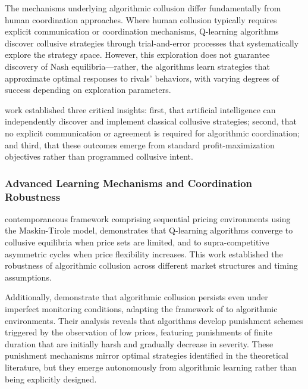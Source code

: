     \begin{quote}
    \end{quote}

The mechanisms underlying algorithmic collusion differ fundamentally from human coordination approaches. Where human collusion typically requires explicit communication or coordination mechanisms, Q-learning algorithms discover collusive strategies through trial-and-error processes that systematically explore the strategy space. However, this exploration does not guarantee discovery of Nash equilibria---rather, the algorithms learn strategies that approximate optimal responses to rivals' behaviors, with varying degrees of success depending on exploration parameters.

\textcite{calvano_artificial_2020} work established three critical insights: first, that artificial intelligence can independently discover and implement classical collusive strategies; second, that no explicit communication or agreement is required for algorithmic coordination; and third, that these outcomes emerge from standard profit-maximization objectives rather than programmed collusive intent.

\subsubsection*{Advanced Learning Mechanisms and Coordination Robustness}

\textcite{klein_autonomous_2021} contemporaneous framework comprising sequential pricing environments using the Maskin-Tirole model, demonstrates that Q-learning algorithms converge to collusive equilibria when price sets are limited, and to supra-competitive asymmetric cycles when price flexibility increases. This work established the robustness of algorithmic collusion across different market structures and timing assumptions.

Additionally, \textcite{calvano_algorithmic_2021} demonstrate that algorithmic collusion persists even under imperfect monitoring conditions, adapting the framework of \textcite{green_noncooperative_1984} to algorithmic environments. Their analysis reveals that algorithms develop punishment schemes triggered by the observation of low prices, featuring punishments of finite duration that are initially harsh and gradually decrease in severity. These punishment mechanisms mirror optimal strategies identified in the theoretical literature, but they emerge autonomously from algorithmic learning rather than being explicitly designed.

